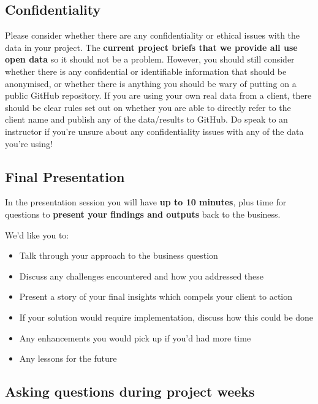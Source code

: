 \documentclass[
]{article}
\providecommand{\tightlist}{%
  \setlength{\itemsep}{0pt}\setlength{\parskip}{0pt}}
\begin{document}
\hypertarget{confidentiality}{%
\subsection{Confidentiality}\label{confidentiality}}

Please consider whether there are any confidentiality or ethical issues
with the data in your project. The \textbf{current project briefs that
we provide all use open data} so it should not be a problem. However,
you should still consider whether there is any confidential or
identifiable information that should be anonymised, or whether there is
anything you should be wary of putting on a public GitHub repository. If
you are using your own real data from a client, there should be clear
rules set out on whether you are able to directly refer to the client
name and publish any of the data/results to GitHub. Do speak to an
instructor if you're unsure about any confidentiality issues with any of
the data you're using!

\hypertarget{final-presentation}{%
\subsection{Final Presentation}\label{final-presentation}}

In the presentation session you will have \textbf{up to 10 minutes},
plus time for questions to \textbf{present your findings and outputs}
back to the business.

We'd like you to:

\begin{itemize}
\tightlist
\item
  Talk through your approach to the business question
\item
  Discuss any challenges encountered and how you addressed these
\item
  Present a story of your final insights which compels your client to
  action
\item
  If your solution would require implementation, discuss how this could
  be done
\item
  Any enhancements you would pick up if you'd had more time
\item
  Any lessons for the future
\end{itemize}

\hypertarget{asking-questions-during-project-weeks}{%
\subsection{Asking questions during project
weeks}\label{asking-questions-during-project-weeks}}
\end{document}
